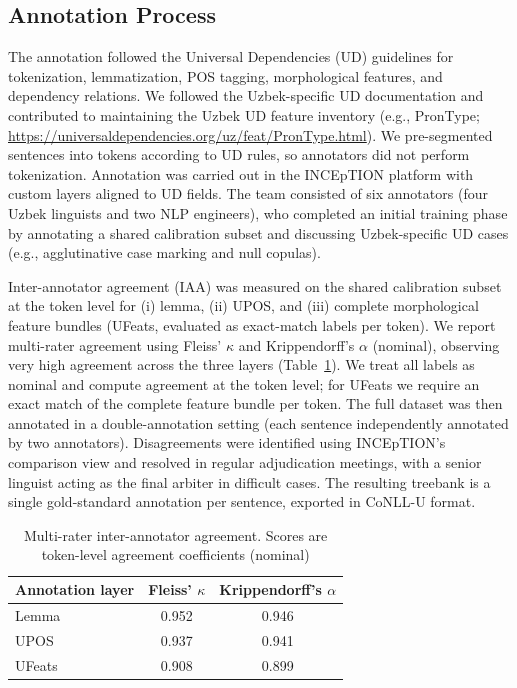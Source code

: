 \documentclass[10pt, a4paper]{article}
\begin{document}
\subsection{Annotation Process}
The annotation followed the Universal Dependencies (UD) guidelines \cite{de-marneffe-etal-2021-universal} for tokenization, lemmatization, POS tagging, morphological features, and dependency relations.
We followed the Uzbek-specific UD documentation and contributed to maintaining the Uzbek UD feature inventory
(e.g., PronType; \url{https://universaldependencies.org/uz/feat/PronType.html}).
We pre-segmented sentences into tokens according to UD rules, so annotators did not perform tokenization.
Annotation was carried out in the INCEpTION platform \cite{klie-etal-2018-inception} with custom layers aligned to UD fields.
The team consisted of six annotators (four Uzbek linguists and two NLP engineers), who completed an initial training phase by annotating a shared calibration subset and discussing Uzbek-specific UD cases (e.g., agglutinative case marking and null copulas).

Inter-annotator agreement (IAA)\cite{richie-etal-2022-inter} was measured on the shared calibration subset at the token level for (i) lemma,
(ii) UPOS, and (iii) complete morphological feature bundles (UFeats, evaluated as exact-match labels per token).
We report multi-rater agreement using Fleiss' $\kappa$\cite{WANG2025100248, 1972-05083-001} and Krippendorff's $\alpha$\cite{GONZALEZPRIETO2023111707} (nominal), observing very high agreement across the three layers (Table~\ref{tab:iaa_6_annotators}).
We treat all labels as nominal and compute agreement at the token level; for UFeats we require an exact match of the complete feature bundle per token.
The full dataset was then annotated in a double-annotation setting (each sentence independently annotated by two annotators). Disagreements were identified using INCEpTION's comparison view and resolved in regular adjudication meetings, with a senior linguist acting as the final arbiter in difficult cases. The resulting treebank is a single gold-standard annotation per sentence, exported in CoNLL-U format.
\begin{table}[ht]
\centering
\small
\begin{tabular}{lcc}
\toprule
\textbf{Annotation layer} & \textbf{Fleiss' $\kappa$} & \textbf{Krippendorff's $\alpha$} \\
\midrule
Lemma                 & 0.952 & 0.946 \\
UPOS                               & 0.937 & 0.941 \\
UFeats        & 0.908 & 0.899 \\
\bottomrule
\end{tabular}
\caption{Multi-rater inter-annotator agreement. Scores are token-level agreement coefficients (nominal)}
\label{tab:iaa_6_annotators}
\end{table}
\end{document}
